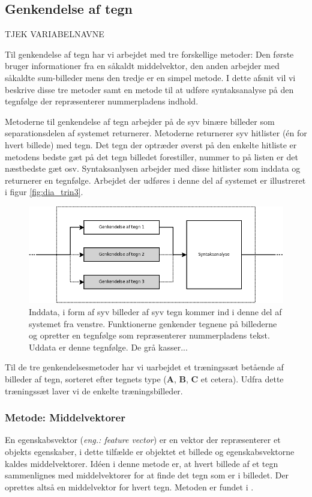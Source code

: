 \subsection{Genkendelse af tegn}
\label{sec_monster}

TJEK VARIABELNAVNE

Til genkendelse af tegn har vi arbejdet med tre forskellige metoder: Den første bruger informationer fra en såkaldt middelvektor, den anden arbejder med såkaldte sum-billeder mens den tredje er en simpel metode. I dette afsnit vil vi beskrive disse tre metoder samt en metode til at udføre syntaksanalyse på den tegnfølge der repræsenterer nummerpladens indhold.

Metoderne til genkendelse af tegn arbejder på de syv binære billeder som separationsdelen af systemet returnerer. Metoderne returnerer syv hitlister (én for hvert billede) med tegn. Det tegn der optræder øverst på den enkelte hitliste er metodens bedste gæt på det tegn billedet forestiller, nummer to på listen er det næstbedste gæt osv. Syntaksanlysen arbejder med disse hitlister som inddata og returnerer en tegnfølge. Arbejdet der udføres i denne del af systemet er illustreret i figur \vref{fig:dia_trin3}.

\begin{figure}[htp]
\centering
\includegraphics[width=12cm]{system/illu/dia_trin3.png} 
\caption{Inddata, i form af syv billeder af syv tegn kommer ind i denne del af systemet fra venstre. Funktionerne genkender tegnene på billederne og opretter en tegnfølge som repræsenterer nummerpladens tekst. Uddata er denne tegnfølge. De grå kasser...}
\label{fig:dia_trin3}
\end{figure}

Til de tre genkendelsesmetoder har vi uarbejdet et træningssæt betående af billeder af tegn, sorteret efter tegnets type (\textbf{A}, \textbf{B}, \textbf{C} et cetera). Udfra dette træningssæt laver vi de enkelte træningsbilleder.

\subsubsection{Metode: Middelvektorer}
En egenskabsvektor (\textit{eng.: feature vector}) er en vektor der repræsenterer et objekts egenskaber, i dette tilfælde er objektet et billede og egenskabsvektorne kaldes middelvektorer. Idéen i denne metode er, at hvert billede af et tegn sammenlignes med middelvektorer for at finde det tegn som er i billedet. Der oprettes altså en middelvektor for hvert tegn. Metoden er fundet i \cite{arth}.

